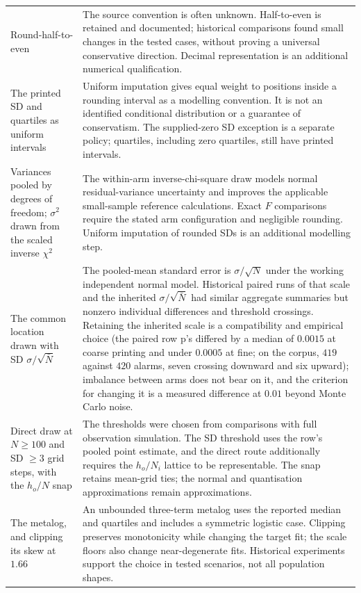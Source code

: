 \documentclass[11pt,a4paper]{article}
\begin{document}
\begin{longtable}{>{\raggedright\arraybackslash}p{} >{\raggedright\arraybackslash}p{}}
\addlinespace
Round-half-to-even &
The source convention is often unknown. Half-to-even is retained and documented; historical comparisons found small changes in the tested cases, without proving a universal conservative direction. Decimal representation is an additional numerical qualification. \\
\addlinespace
The printed SD and quartiles as uniform intervals &
Uniform imputation gives equal weight to positions inside a rounding interval as a modelling convention. It is not an identified conditional distribution or a guarantee of conservatism. The supplied-zero SD exception is a separate policy; quartiles, including zero quartiles, still have printed intervals. \\
\addlinespace
Variances pooled by degrees of freedom; $\sigma^2$ drawn from the scaled inverse $\chi^2$ &
The within-arm inverse-chi-square draw models normal residual-variance uncertainty and improves the applicable small-sample reference calculations. Exact $F$ comparisons require the stated arm configuration and negligible rounding. Uniform imputation of rounded SDs is an additional modelling step. \\
\addlinespace
The common location drawn with SD $\sigma/\sqrt{\bar{N}}$ &
The pooled-mean standard error is $\sigma/\sqrt N$ under the working independent normal model. Historical paired runs of that scale and the inherited $\sigma/\sqrt{\bar N}$ had similar aggregate summaries but nonzero individual differences and threshold crossings. Retaining the inherited scale is a compatibility and empirical choice (the paired row p's differed by a median of $0.0015$ at coarse printing and under $0.0005$ at fine; on the corpus, $419$ against $420$ alarms, seven crossing downward and six upward); imbalance between arms does not bear on it, and the criterion for changing it is a measured difference at $0.01$ beyond Monte Carlo noise. \\
\addlinespace
Direct draw at $N \ge 100$ and SD $\ge 3$ grid steps, with the $h_o/N$ snap &
The thresholds were chosen from comparisons with full observation simulation. The SD threshold uses the row's pooled point estimate, and the direct route additionally requires the $h_o/N_i$ lattice to be representable. The snap retains mean-grid ties; the normal and quantisation approximations remain approximations. \\
\addlinespace
The metalog, and clipping its skew at $1.66$ &
An unbounded three-term metalog uses the reported median and quartiles and includes a symmetric logistic case. Clipping preserves monotonicity while changing the target fit; the scale floors also change near-degenerate fits. Historical experiments support the choice in tested scenarios, not all population shapes. \\

\end{longtable}
\end{document}
